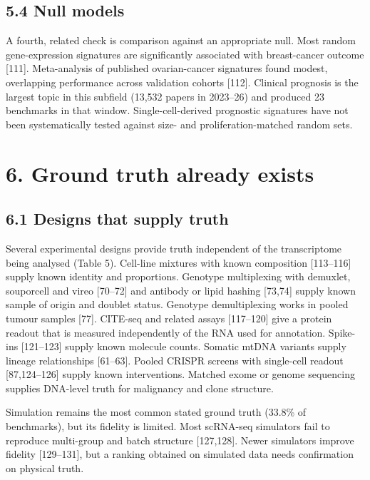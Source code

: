 \documentclass{article}
\begin{document}
\subsection{5.4 Null models}\label{null-models}

A fourth, related check is comparison against an appropriate null. Most
random gene-expression signatures are significantly associated with
breast-cancer outcome {[}111{]}. Meta-analysis of published
ovarian-cancer signatures found modest, overlapping performance across
validation cohorts {[}112{]}. Clinical prognosis is the largest topic in
this subfield (13,532 papers in 2023--26) and produced 23 benchmarks in
that window. Single-cell-derived prognostic signatures have not been
systematically tested against size- and proliferation-matched random
sets.

\section{6. Ground truth already exists}\label{ground-truth-already-exists}

\subsection{6.1 Designs that supply truth}\label{designs-that-supply-truth}

Several experimental designs provide truth independent of the
transcriptome being analysed (Table 5). Cell-line mixtures with known
composition {[}113--116{]} supply known identity and proportions.
Genotype multiplexing with demuxlet, souporcell and vireo {[}70--72{]}
and antibody or lipid hashing {[}73,74{]} supply known sample of origin
and doublet status. Genotype demultiplexing works in pooled tumour
samples {[}77{]}. CITE-seq and related assays {[}117--120{]} give a
protein readout that is measured independently of the RNA used for
annotation. Spike-ins {[}121--123{]} supply known molecule counts.
Somatic mtDNA variants supply lineage relationships {[}61--63{]}. Pooled
CRISPR screens with single-cell readout {[}87,124--126{]} supply known
interventions. Matched exome or genome sequencing supplies DNA-level
truth for malignancy and clone structure.

Simulation remains the most common stated ground truth (33.8\% of
benchmarks), but its fidelity is limited. Most scRNA-seq simulators fail
to reproduce multi-group and batch structure {[}127,128{]}. Newer
simulators improve fidelity {[}129--131{]}, but a ranking obtained on
simulated data needs confirmation on physical truth.
\end{document}
